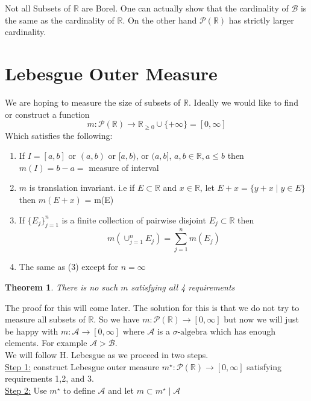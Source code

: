 \documentclass[11pt]{article}
\newtheorem{theorem}{Theorem}[section]
\newcommand{\siga}{\sigma\text{-algebra}}
\newcommand{\pwr}[1]{\mathcal{P}(\mathbb{#1})}
\begin{document}
    Not all Subsets of $\mathbb{R}$ are Borel.
    One can actually show that the cardinality of $\mathcal{B}$ is the same as the cardinality of $\mathbb{R}$.
    On the other hand $\mathcal{P}(\mathbb{R})$ has strictly larger cardinality.


    \section{Lebesgue Outer Measure}\label{sec:legesgue-outer-measure}

    We are hoping to measure the size of subsets of $\mathbb{R}$.
    Ideally we would like to find or construct a function
    \[
        m: \pwr{R} \rightarrow \mathbb{R}_{\geq 0} \cup \{ + \infty \} = [0, \infty]
    \]
    Which satisfies the following:
    \begin{enumerate}
        \item If $I=[a,b]$ or $(a,b)$ or $[a,b)$, or $(a,b]$, $a,b \in \mathbb{R}, a \leq b$ then $m(I) = b-a = $ measure of interval
        \item $m$ is translation invariant.
        i.e if $E \subset \mathbb{R}$ and $x \in \mathbb{R}$, let $E + x = \{ y+x \mid y \in E \}$ then $m(E+x)$ = m(E)
        \item If $\{ E_j \}_{j=1}^{n}$ is a finite collection of pairwise disjoint $E_j \subset \mathbb{R}$ then
        \[
            m \left( \cup_{j=1}^{n} E_j \right) = \sum_{j=1}^{n} m(E_j)
        \]
        \item The same as (3) except for $n = \infty$
    \end{enumerate}

    \begin{theorem}
        There is no such $m$ satisfying all 4 requirements
    \end{theorem}

    The proof for this will come later.
    The solution for this is that we do not try to measure all subsets of $\mathbb{R}$.
    So we have $m: \pwr{R} \rightarrow [0, \infty]$ but now we will just be happy with $m: \mathcal{A} \rightarrow [0,\infty]$ where $\mathcal{A}$ is a $\siga$ which has enough elements.
    For example $\mathcal{A} > \mathcal{B}$.\\

    We will follow H. Lebesgue as we proceed in two steps.\\

    \underline{Step 1:} construct Lebesgue outer measure $m^{\star}: \pwr{R} \rightarrow [0, \infty]$ satisfying requirements 1,2, and 3.\\

    \underline{Step 2:} Use $m^{\star}$ to define $\mathcal{A}$ and let $m \subset m^{\star} \mid \mathcal{A}$
\end{document}
